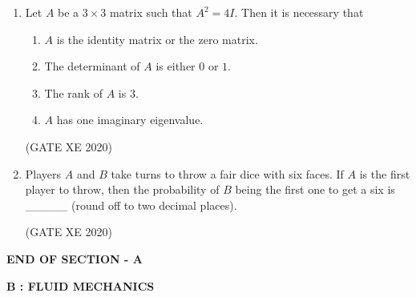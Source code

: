 \documentclass[12pt]{article}
\begin{document}
\begin{enumerate}
  \item Let $A$ be a $3 \times 3$ matrix such that $A^2 = 4I$. Then it is necessary that
  \begin{enumerate}
    \item $A$ is the identity matrix or the zero matrix.
    \item The determinant of $A$ is either $0$ or $1$.
    \item The rank of $A$ is $3$.
    \item $A$ has one imaginary eigenvalue.
  \end{enumerate}
  (GATE XE 2020)

  \item Players $A$ and $B$ take turns to throw a fair dice with six faces. If $A$ is the first player to throw, then the probability of $B$ being the first one to get a six is \_\_\_\_\_ (round off to two decimal places).
  
  (GATE XE 2020)


\end{enumerate}

\begin{center}
    \textbf{END OF SECTION - A}
\end{center}

\newpage
\begin{center}
    {\Large \textbf{B : FLUID MECHANICS} }
\end{center}
\end{document}
